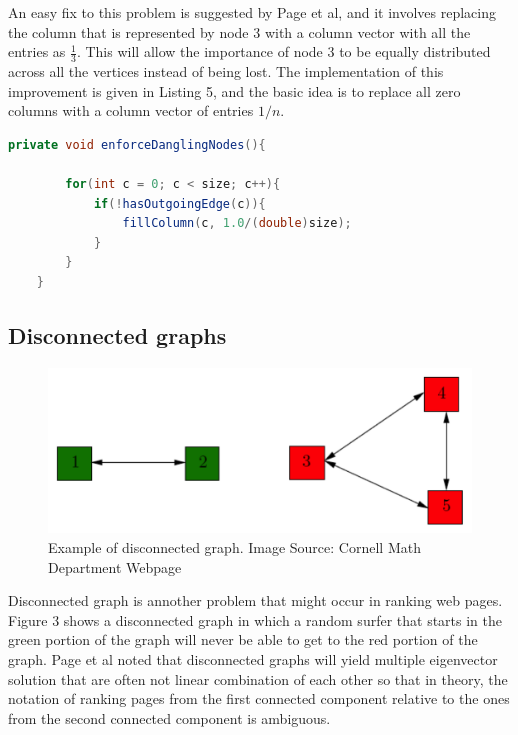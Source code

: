 \documentclass[9.5pt]{extarticle}
\begin{document}
An easy fix to this problem is suggested by Page et al, and it involves replacing the column that is represented by node 3 with a column vector with all the entries as $\frac{1}{3}$. This will allow the importance of node 3 to be equally distributed across all the vertices instead of being lost. The implementation of this improvement is given in Listing 5, and the basic idea is to replace all zero columns with a column vector of entries $1/n$.

\begin{lstlisting}[language=java,caption={enforceDanglingNodes}]
	private void enforceDanglingNodes(){

        for(int c = 0; c < size; c++){
            if(!hasOutgoingEdge(c)){
                fillColumn(c, 1.0/(double)size);
            }
        }
    }
\end{lstlisting}

\subsection{Disconnected graphs}

\begin{figure}[H]
\centering
\includegraphics[scale=0.5]{disconnected.png}
\caption{Example of disconnected graph. Image Source: Cornell Math Department Webpage}
\label{Figure 3}
\end{figure}

Disconnected graph is annother problem that might occur in ranking web pages. Figure 3 shows a disconnected graph in which a random surfer that starts in the green portion of the graph will never be able to get to the red portion of the graph. Page et al noted that disconnected graphs will yield multiple eigenvector solution that are often not linear combination of each other so that in theory, the notation of ranking pages from the first connected component relative to the ones from the second connected component is ambiguous. \\
\end{document}
